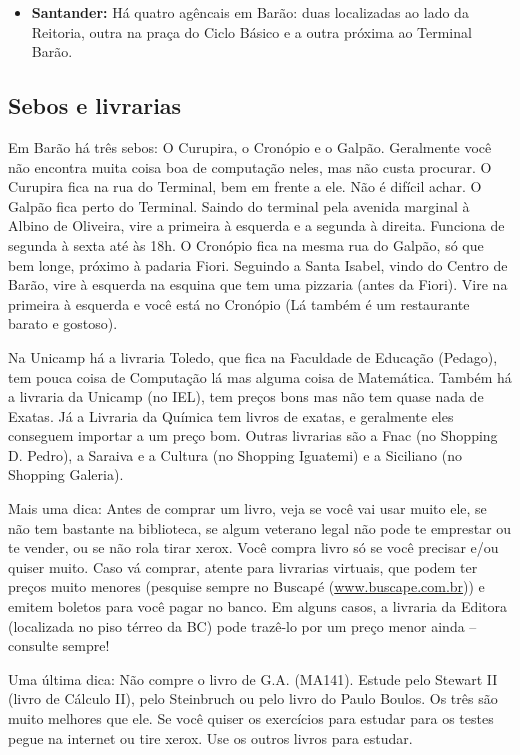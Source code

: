 \begin{itemize}
\item  \textbf{Santander:} Há quatro agêncais em Barão: duas localizadas ao lado da Reitoria, outra na praça do Ciclo Básico e a outra próxima ao Terminal Barão.
\end{itemize}

\subsection{Sebos e livrarias}

Em Barão há três sebos: O Curupira, o Cronópio e o Galpão. Geralmente você não
encontra muita coisa boa de computação neles, mas não custa procurar. O Curupira
fica na rua do Terminal, bem em frente a ele. Não é difícil achar. O Galpão fica
perto do Terminal. Saindo do terminal pela avenida marginal à Albino de
Oliveira, vire a primeira à esquerda e a segunda à direita. Funciona de segunda
à sexta até às 18h. O Cronópio fica na mesma rua do Galpão, só que bem longe,
próximo à padaria Fiori. Seguindo a Santa Isabel, vindo do Centro de Barão, vire
à esquerda na esquina que tem uma pizzaria (antes da Fiori). Vire na primeira
à esquerda e você está no Cronópio (Lá também é um restaurante barato
e gostoso).

Na Unicamp há a livraria Toledo, que fica na Faculdade de Educação (Pedago), tem
pouca coisa de Computação lá mas alguma coisa de Matemática. Também há
a livraria da Unicamp (no IEL), tem preços bons mas não tem quase nada de
Exatas. Já a Livraria da Química tem livros de exatas, e geralmente eles
conseguem importar a um preço bom. Outras livrarias são a Fnac (no Shopping D.
Pedro), a Saraiva e a Cultura (no Shopping Iguatemi) e a Siciliano (no Shopping
Galeria).

Mais uma dica: Antes de comprar um livro, veja se você vai usar muito ele, se
não tem bastante na biblioteca, se algum veterano legal não pode te emprestar ou
te vender, ou se não rola tirar xerox. Você compra livro só se você precisar
e/ou quiser muito. Caso vá comprar, atente para livrarias virtuais, que podem
ter preços muito menores (pesquise sempre no Buscapé
(\url{www.buscape.com.br})) e emitem boletos para você pagar no banco.
Em alguns casos, a livraria da Editora (localizada no piso térreo da BC) pode
trazê-lo por um preço menor ainda -- consulte sempre!

Uma última dica: Não compre o livro de G.A. (MA141). Estude pelo Stewart II
(livro de Cálculo II), pelo Steinbruch ou pelo livro do Paulo
Boulos. Os três são muito melhores que ele. Se você quiser os exercícios para
estudar para os testes pegue na internet ou tire xerox. Use os outros livros
para estudar.

